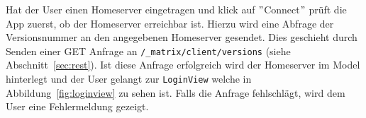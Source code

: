     Hat der User einen Homeserver eingetragen und klick auf \("\)Connect\("\) prüft die App zuerst, ob der Homeserver erreichbar ist.
    Hierzu wird eine Abfrage der Versionsnummer an den angegebenen Homeserver gesendet.
    Dies geschieht durch Senden einer GET Anfrage an \texttt{/\_matrix/client/versions} (siehe Abschnitt~\ref{sec:rest}).
    Ist diese Anfrage erfolgreich wird der Homeserver im Model hinterlegt und der User gelangt zur \texttt{LoginView} welche in Abbildung~\ref{fig:loginview} zu sehen ist.
    Falls die Anfrage fehlschlägt, wird dem User eine Fehlermeldung gezeigt.
